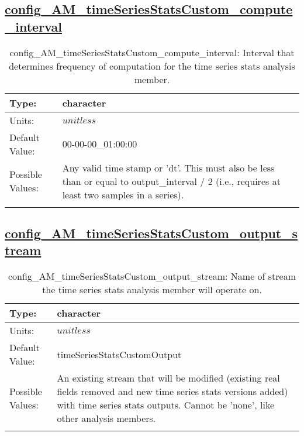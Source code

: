 \subsection[config\_AM\_timeSeriesStatsCustom\_compute\_interval]{\hyperref[sec:nm_tab_AM_timeSeriesStatsCustom]{config\_AM\_timeSeriesStatsCustom\_compute\_interval}}
\label{subsec:nm_sec_config_AM_timeSeriesStatsCustom_compute_interval}
\begin{center}
\begin{longtable}{| p{2.0in} || p{4.0in} |}
    \hline
    Type: & character \\
    \hline
    Units: & $unitless$ \\
    \hline
    Default Value: & 00-00-00\_01:00:00 \\
    \hline
    Possible Values: & Any valid time stamp or 'dt'. This must also be less than or equal to output\_interval / 2 (i.e., requires at least two samples in a series). \\
    \hline
    \caption{config\_AM\_timeSeriesStatsCustom\_compute\_interval: Interval that determines frequency of computation for the time series stats analysis member.}
\end{longtable}
\end{center}
\subsection[config\_AM\_timeSeriesStatsCustom\_output\_stream]{\hyperref[sec:nm_tab_AM_timeSeriesStatsCustom]{config\_AM\_timeSeriesStatsCustom\_output\_stream}}
\label{subsec:nm_sec_config_AM_timeSeriesStatsCustom_output_stream}
\begin{center}
\begin{longtable}{| p{2.0in} || p{4.0in} |}
    \hline
    Type: & character \\
    \hline
    Units: & $unitless$ \\
    \hline
    Default Value: & timeSeriesStatsCustomOutput \\
    \hline
    Possible Values: & An existing stream that will be modified (existing real fields removed and new time series stats versions added) with time series stats outputs. Cannot be 'none', like other analysis members. \\
    \hline
    \caption{config\_AM\_timeSeriesStatsCustom\_output\_stream: Name of stream the time series stats analysis member will operate on.}
\end{longtable}
\end{center}

